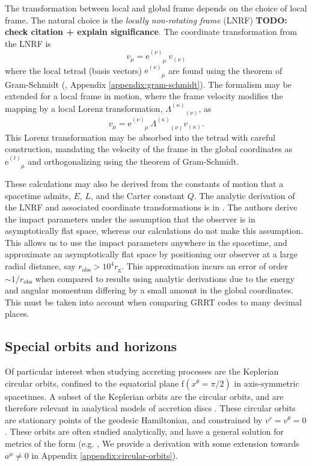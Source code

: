 \documentclass[fleqn,usenatbib]{mnras}
\newcommand{\todo}[1]{{\noindent \bf \color{red} TODO: #1}}
\newcommand{\e}{\text{e}}
\newcommand{\rg}{r_\text{g}}
\newcommand{\utensor}[3]{#1^{#2}_{\phantom{#2}#3}}
\begin{document}
The transformation between local and global frame depends on the choice of
local frame. The natural choice is the \emph{locally non-rotating frame} (LNRF)
\citep{bardeen_rotating_1972} \todo{check citation + explain significance}. The
coordinate transformation from the LNRF is
\begin{equation}
    \label{eq:local-to-global-velocity}
    v_\mu = \e^{(\nu)}_{\phantom{(\nu)}\mu}\  v_{(\nu)}
\end{equation}
where the local tetrad (basis vectors) $\e^{(\nu)}_{\phantom{(\nu)}\mu}$ are found
using the theorem of Gram-Schmidt (\citealp{schmidt_uber_1989}, Appendix
\ref{appendix:gram-schmidt}). The formalism may be extended for a local frame
in motion, where the frame velocity modifies the mapping by a local Lorenz
transformation, $\Lambda^{(\kappa)}_{\phantom{(\kappa)}(\nu)}$, as
\begin{equation}
    v_\mu = \e^{(\nu)}_{\phantom{(\nu)}\mu}\  \Lambda^{(\kappa)}_{\phantom{(a)}(\nu)} v_{(\kappa)}.
\end{equation}
This Lorenz transformation may be absorbed into the tetrad with careful
construction, mandating the velocity of the frame in the global coordinates as
$\utensor{\e}{(t)}{\mu}$ and orthogonalizing using the theorem of Gram-Schmidt.

These calculations may also be derived from the constants of motion that a
spacetime admits, $E$, $L$, and the Carter constant $Q$. The analytic
derivation of the LNRF and associated coordinate transformations is in
\cite{cunningham_optical_1973}. The authors derive the impact parameters under
the assumption that the observer is in asymptotically flat space, whereas our
calculations do not make this assumption. This allows us to use the impact
parameters anywhere in the spacetime, and approximate an asymptotically flat
space by positioning our observer at a large radial distance, say $r_\text{obs}
> 10^4 \rg$. This approximation incurs an error of order $\sim1/r_\text{obs}$
when compared to results using analytic derivations due to the energy and
angular momentum differing by a small amount in the global coordinates. This
must be taken into account when comparing GRRT codes to many decimal places.

\subsection{Special orbits and horizons}
\label{sec:special-orbits}

Of particular interest when studying accreting processes are the Keplerian
circular orbits, confined to the equatorial plane f$(x^\theta = \pi/2)$ in
axis-symmetric spacetimes. A subset of the Keplerian orbits are the circular
orbits, and are therefore relevant in analytical models of accretion discs
\citep{shakura_black_1973}. These circular orbits are stationary points of the
geodesic Hamiltonian, and constrained by $v^r = v^\theta = 0$.  These orbits are
often studied analytically, and have a general solution for metrics of the form
\citep{eq:static_axisymmetric_metric} (e.g. \citealp{johannsen_regular_2013},
We provide a derivation with some extension towards $a^\mu \neq 0$ in Appendix
\ref{appendix:circular-orbits}).
\end{document}
